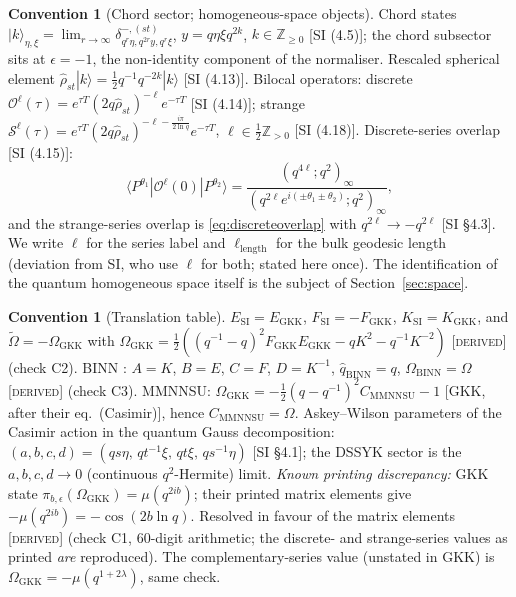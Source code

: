 \documentclass[11pt,a4paper]{article}
\newcommand{\DERIVED}{{\color{teal}\textsc{[derived]}}}
\theoremstyle{definition}
\newtheorem{convention}[definition]{Convention}
\theoremstyle{plain}
\newcommand{\Cas}{\Omega}                       %
\newcommand{\tCas}{\tilde\Omega}                %
\newcommand{\Z}{\mathbb{Z}}
\newcommand{\ket}[1]{|#1\rangle}
\newcommand{\bra}[1]{\langle #1|}
\renewcommand{\P}{P}                            %
\renewcommand{\O}{\mathcal{O}}                  %
\begin{document}
\begin{convention}[Chord sector; homogeneous-space objects]\label{conv:chord}
Chord states $\ket{k}_{\eta,\xi}=\lim_{r\to\infty}\delta^{-,(st)}_{q^{r}\eta,q^{2r}y,q^{r}\xi}$,
$y=q\eta\xi q^{2k}$, $k\in\Z_{\ge0}$ [SI (4.5)]; the chord subsector sits at $\epsilon=-1$, the
non-identity component of the normaliser. Rescaled spherical element
$\hat\rho_{st}\ket{k}=\tfrac12 q^{-1}q^{-2k}\ket{k}$ [SI (4.13)]. Bilocal operators:
discrete $\O^{\ell}(\tau)=e^{\tau T}(2q\hat\rho_{st})^{-\ell}e^{-\tau T}$ [SI (4.14)]; strange
$\mathcal{S}^{\ell}(\tau)=e^{\tau T}(2q\hat\rho_{st})^{-\ell-\frac{i\pi}{2\ln q}}e^{-\tau T}$,
$\ell\in\tfrac12\Z_{>0}$ [SI (4.18)]. Discrete-series overlap [SI (4.15)]:
\begin{equation}\label{eq:discreteoverlap}
  \bra{\P^{\theta_1}}\O^{\ell}(0)\ket{\P^{\theta_2}}
  =\frac{(q^{4\ell};q^{2})_{\infty}}{(q^{2\ell}e^{i(\pm\theta_1\pm\theta_2)};q^{2})_{\infty}},
\end{equation}
and the strange-series overlap is \eqref{eq:discreteoverlap} with $q^{2\ell}\to -q^{2\ell}$
[SI \S4.3]. We write $\ell$ for the series label and $\ell_{\mathrm{length}}$ for the bulk
geodesic length (deviation from SI, who use $\ell$ for both; stated here once).
The identification of the quantum homogeneous space itself is the subject of
Section~\ref{sec:space}.
\end{convention}

\begin{convention}[Translation table]\label{conv:translation}
$E_{\mathrm{SI}}=E_{\mathrm{GKK}}$, $F_{\mathrm{SI}}=-F_{\mathrm{GKK}}$,
$K_{\mathrm{SI}}=K_{\mathrm{GKK}}$, and $\tCas=-\Omega_{\mathrm{GKK}}$ with
$\Omega_{\mathrm{GKK}}=\tfrac12((q^{-1}-q)^{2}F_{\mathrm{GKK}}E_{\mathrm{GKK}}
-qK^{2}-q^{-1}K^{-2})$ \DERIVED{} (check C2). BINN \cite{Berkooz:2022qgroup}: $A=K$, $B=E$,
$C=F$, $D=K^{-1}$, $\hat q_{\mathrm{BINN}}=q$, $\Omega_{\mathrm{BINN}}=\Cas$ \DERIVED{} (check
C3). MMNNSU: $\Omega_{\mathrm{GKK}}=-\tfrac12(q-q^{-1})^{2}C_{\mathrm{MMNNSU}}-1$ [GKK, after
their eq.\ (Casimir)], hence $C_{\mathrm{MMNNSU}}=\Cas$. Askey--Wilson parameters of the Casimir
action in the quantum Gauss decomposition: $(a,b,c,d)=(qs\eta,\,qt^{-1}\xi,\,qt\xi,\,qs^{-1}\eta)$
[SI \S4.1]; the DSSYK sector is the $a,b,c,d\to0$ (continuous $q^{2}$-Hermite) limit.
\emph{Known printing discrepancy:} GKK state $\pi_{b,\epsilon}(\Omega_{\mathrm{GKK}})
=\mu(q^{2ib})$; their printed matrix elements give $-\mu(q^{2ib})=-\cos(2b\ln q)$. Resolved in
favour of the matrix elements \DERIVED{} (check C1, 60-digit arithmetic; the discrete- and
strange-series values as printed \emph{are} reproduced). The complementary-series value (unstated
in GKK) is $\Omega_{\mathrm{GKK}}=-\mu(q^{1+2\lambda})$, same check.
\end{convention}
\end{document}
